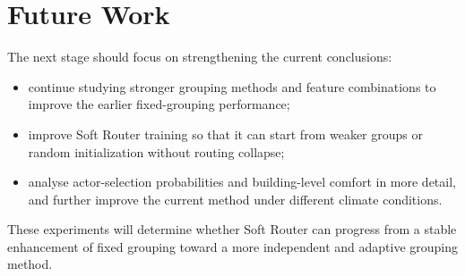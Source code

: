 \section{Future Work}

The next stage should focus on strengthening the current conclusions:
\begin{itemize}
  \item continue studying stronger grouping methods and feature combinations to
  improve the earlier fixed-grouping performance;
  \item improve Soft Router training so that it can start from weaker groups or
  random initialization without routing collapse;
  \item analyse actor-selection probabilities and building-level comfort in
  more detail, and further improve the current method under different climate
  conditions.
\end{itemize}

These experiments will determine whether Soft Router can progress from a stable
enhancement of fixed grouping toward a more independent and adaptive grouping
method.
